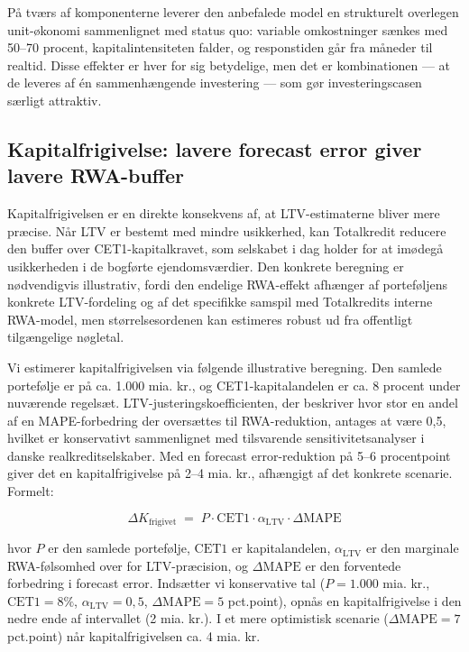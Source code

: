 \documentclass[12pt]{article}
\begin{document}
På tværs af komponenterne leverer den anbefalede model en strukturelt overlegen unit-økonomi sammenlignet med status quo: variable omkostninger sænkes med 50--70 procent, kapitalintensiteten falder, og responstiden går fra måneder til realtid. Disse effekter er hver for sig betydelige, men det er kombinationen --- at de leveres af én sammenhængende investering --- som gør investeringscasen særligt attraktiv.

\subsection{Kapitalfrigivelse: lavere forecast error giver lavere RWA-buffer}
\label{sec:fin-kapital}
Kapitalfrigivelsen er en direkte konsekvens af, at LTV-estimaterne bliver mere præcise. Når LTV er bestemt med mindre usikkerhed, kan Totalkredit reducere den buffer over CET1-kapitalkravet, som selskabet i dag holder for at imødegå usikkerheden i de bogførte ejendomsværdier. Den konkrete beregning er nødvendigvis illustrativ, fordi den endelige RWA-effekt afhænger af porteføljens konkrete LTV-fordeling og af det specifikke samspil med Totalkredits interne RWA-model, men størrelsesordenen kan estimeres robust ud fra offentligt tilgængelige nøgletal.

Vi estimerer kapitalfrigivelsen via følgende illustrative beregning. Den samlede portefølje er på ca. 1.000 mia. kr., og CET1-kapitalandelen er ca. 8 procent under nuværende regelsæt. LTV-justeringskoefficienten, der beskriver hvor stor en andel af en MAPE-forbedring der oversættes til RWA-reduktion, antages at være 0,5, hvilket er konservativt sammenlignet med tilsvarende sensitivitetsanalyser i danske realkreditselskaber. Med en forecast error-reduktion på 5--6 procentpoint giver det en kapitalfrigivelse på 2--4 mia. kr., afhængigt af det konkrete scenarie. Formelt:

\begin{equation}
\Delta K_{\text{frigivet}} \;=\; P \cdot \text{CET1} \cdot \alpha_{\text{LTV}} \cdot \Delta\text{MAPE}
\label{eq:kapital}
\end{equation}

hvor $P$ er den samlede portefølje, $\text{CET1}$ er kapitalandelen, $\alpha_{\text{LTV}}$ er den marginale RWA-følsomhed over for LTV-præcision, og $\Delta\text{MAPE}$ er den forventede forbedring i forecast error. Indsætter vi konservative tal ($P=1.000$ mia. kr., $\text{CET1}=8\%$, $\alpha_{\text{LTV}}=0{,}5$, $\Delta\text{MAPE}=5$ pct.point), opnås en kapitalfrigivelse i den nedre ende af intervallet (2 mia. kr.). I et mere optimistisk scenarie ($\Delta\text{MAPE}=7$ pct.point) når kapitalfrigivelsen ca. 4 mia. kr.
\end{document}
